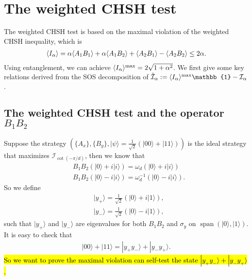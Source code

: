 \documentclass[11pt,letterpaper]{article}
\newcommand{\ket}[1]{|#1\rangle}
\DeclarePairedDelimiter{\ip}{\langle}{\rangle}
\DeclareMathOperator{\spn}{span}
\newcommand{\1}{\mathbb{1}}
\newcommand{\I}{\mathcal{I}}
\theoremstyle{definition}
\begin{document}
\section{The weighted CHSH test}
\label{sec:weightedchsh}
The weighted CHSH test is based on the maximal violation of the weighted CHSH inequality,
which is
\begin{align}
	\ip{I_\alpha} = \alpha \ip{A_1B_1}+\alpha\ip{A_1B_2} + \ip{A_2B_1} - \ip{A_2B_2}\leq 2\alpha.
\end{align}
Using entanglement, we can achieve $\ip{I_\alpha}^{\max} = 2\sqrt{1+\alpha^2}$.
We first give some key relations derived from the SOS decomposition of $\tilde{\I}_\alpha := \ip{I_\alpha}^{\max}\1 - \I_\alpha$.
\subsection{The weighted CHSH test and the operator $B_1B_2$}
Suppose the strategy $\left(\{A_x\}, \{B_y\}, \ket{\psi}=\frac{1}{\sqrt{2}}(\ket{00}+\ket{11})\right)$ is the ideal strategy that maximizes $\I_{\cot(-\pi/d)}$, then
we know that
\begin{align}
	&B_1B_2 (\ket{0} + i\ket{i}) = \omega_d (\ket{0} + i\ket{i})\\
	&B_1B_2 (\ket{0} - i\ket{i}) = \omega_d^{-1} (\ket{0} - i\ket{i}).
\end{align}
So we define 
\begin{align}
	&\ket{y_+} = \frac{1}{\sqrt{2}}(\ket{0}+ i\ket{1}),\\
	&\ket{y_-}=\frac{1}{\sqrt{2}}(\ket{0}- i\ket{1}),
\end{align}	
such that $\ket{y_+}$ and $\ket{y_-}$ are eigenvalues for both $B_1B_2$ and $\sigma_y$ on $\spn(\ket{0}, \ket{1})$.
It is easy to check that 
\begin{align}
	\ket{00}+\ket{11} = \ket{y_+y_-} + \ket{y_-y_+}.
\end{align}
\hl{So we want to prove the maximal violation can self-test the state $\ket{y_+y_-} + \ket{y_-y_+}$.}
\end{document}
